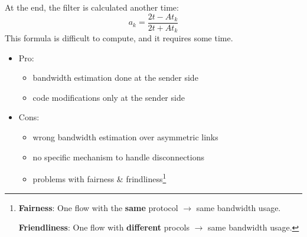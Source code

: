 At the end, the filter is calculated another time:
\begin{equation}
a_k = \frac{2t - At_k}{2t + At_k}
\end{equation}
This formula is difficult to compute, and it requires some time.
\begin{itemize}
\item Pro:
  \begin{itemize}
    \item bandwidth estimation done at the sender side
    \item code modifications only at the sender side
  \end{itemize}
\item Cons:
  \begin{itemize}
  \item wrong bandwidth estimation over asymmetric links
  \item no specific mechanism to handle disconnections
  \item problems with fairness \& frindliness\footnote{\textbf{Fairness}:
    One flow with the \textbf{same} protocol $\rightarrow$ same
    bandwidth usage.
    
    \textbf{Friendliness}: One flow with \textbf{different} procols
    $\rightarrow$ same bandwidth usage.}
  \end{itemize}
\end{itemize}
